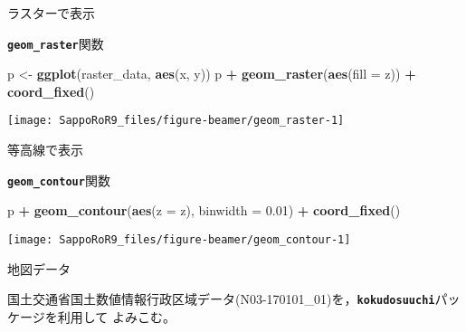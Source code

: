 \documentclass[ignorenonframetext,]{beamer}
\newenvironment{Shaded}{\begin{snugshade}}{\end{snugshade}}
\newcommand{\KeywordTok}[1]{\textcolor[rgb]{0.13,0.29,0.53}{\textbf{#1}}}
\newcommand{\DataTypeTok}[1]{\textcolor[rgb]{0.13,0.29,0.53}{#1}}
\newcommand{\DecValTok}[1]{\textcolor[rgb]{0.00,0.00,0.81}{#1}}
\newcommand{\FloatTok}[1]{\textcolor[rgb]{0.00,0.00,0.81}{#1}}
\newcommand{\StringTok}[1]{\textcolor[rgb]{0.31,0.60,0.02}{#1}}
\newcommand{\OperatorTok}[1]{\textcolor[rgb]{0.81,0.36,0.00}{\textbf{#1}}}
\newcommand{\NormalTok}[1]{#1}
\let\oldShaded\Shaded
\let\endoldShaded\endShaded
\renewenvironment{Shaded}{\footnotesize\oldShaded}{\endoldShaded}
\begin{document}
\begin{frame}[fragile]{ラスターで表示}

\textbf{\texttt{geom\_raster}}関数

\begin{Shaded}
\begin{Highlighting}[]
\NormalTok{p <-}\StringTok{ }\KeywordTok{ggplot}\NormalTok{(raster_data, }\KeywordTok{aes}\NormalTok{(x, y))}
\NormalTok{p }\OperatorTok{+}\StringTok{ }\KeywordTok{geom_raster}\NormalTok{(}\KeywordTok{aes}\NormalTok{(}\DataTypeTok{fill =}\NormalTok{ z)) }\OperatorTok{+}\StringTok{ }\KeywordTok{coord_fixed}\NormalTok{()}
\end{Highlighting}
\end{Shaded}

\texttt{[image: SappoRoR9\_files/figure-beamer/geom\_raster-1]}

\end{frame}

\begin{frame}[fragile]{等高線で表示}

\textbf{\texttt{geom\_contour}}関数

\begin{Shaded}
\begin{Highlighting}[]
\NormalTok{p }\OperatorTok{+}\StringTok{ }\KeywordTok{geom_contour}\NormalTok{(}\KeywordTok{aes}\NormalTok{(}\DataTypeTok{z =}\NormalTok{ z), }\DataTypeTok{binwidth =} \FloatTok{0.01}\NormalTok{) }\OperatorTok{+}\StringTok{ }\KeywordTok{coord_fixed}\NormalTok{()}
\end{Highlighting}
\end{Shaded}

\texttt{[image: SappoRoR9\_files/figure-beamer/geom\_contour-1]}

\end{frame}

\begin{frame}[fragile]{地図データ}

国土交通省国土数値情報行政区域データ(N03-170101\_01)を，\textbf{\texttt{kokudosuuchi}}パッケージを利用して
よみこむ。

\begin{Shaded}
\end{Shaded}

\end{frame}
\end{document}
